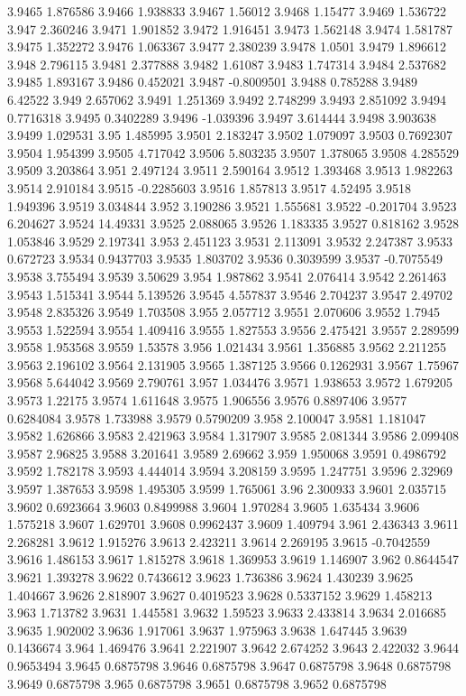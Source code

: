 3.9465  1.876586
3.9466  1.938833
3.9467  1.56012
3.9468  1.15477
3.9469  1.536722
3.947  2.360246
3.9471  1.901852
3.9472  1.916451
3.9473  1.562148
3.9474  1.581787
3.9475  1.352272
3.9476  1.063367
3.9477  2.380239
3.9478  1.0501
3.9479  1.896612
3.948  2.796115
3.9481  2.377888
3.9482  1.61087
3.9483  1.747314
3.9484  2.537682
3.9485  1.893167
3.9486  0.452021
3.9487  -0.8009501
3.9488  0.785288
3.9489  6.42522
3.949  2.657062
3.9491  1.251369
3.9492  2.748299
3.9493  2.851092
3.9494  0.7716318
3.9495  0.3402289
3.9496  -1.039396
3.9497  3.614444
3.9498  3.903638
3.9499  1.029531
3.95  1.485995
3.9501  2.183247
3.9502  1.079097
3.9503  0.7692307
3.9504  1.954399
3.9505  4.717042
3.9506  5.803235
3.9507  1.378065
3.9508  4.285529
3.9509  3.203864
3.951  2.497124
3.9511  2.590164
3.9512  1.393468
3.9513  1.982263
3.9514  2.910184
3.9515  -0.2285603
3.9516  1.857813
3.9517  4.52495
3.9518  1.949396
3.9519  3.034844
3.952  3.190286
3.9521  1.555681
3.9522  -0.201704
3.9523  6.204627
3.9524  14.49331
3.9525  2.088065
3.9526  1.183335
3.9527  0.818162
3.9528  1.053846
3.9529  2.197341
3.953  2.451123
3.9531  2.113091
3.9532  2.247387
3.9533  0.672723
3.9534  0.9437703
3.9535  1.803702
3.9536  0.3039599
3.9537  -0.7075549
3.9538  3.755494
3.9539  3.50629
3.954  1.987862
3.9541  2.076414
3.9542  2.261463
3.9543  1.515341
3.9544  5.139526
3.9545  4.557837
3.9546  2.704237
3.9547  2.49702
3.9548  2.835326
3.9549  1.703508
3.955  2.057712
3.9551  2.070606
3.9552  1.7945
3.9553  1.522594
3.9554  1.409416
3.9555  1.827553
3.9556  2.475421
3.9557  2.289599
3.9558  1.953568
3.9559  1.53578
3.956  1.021434
3.9561  1.356885
3.9562  2.211255
3.9563  2.196102
3.9564  2.131905
3.9565  1.387125
3.9566  0.1262931
3.9567  1.75967
3.9568  5.644042
3.9569  2.790761
3.957  1.034476
3.9571  1.938653
3.9572  1.679205
3.9573  1.22175
3.9574  1.611648
3.9575  1.906556
3.9576  0.8897406
3.9577  0.6284084
3.9578  1.733988
3.9579  0.5790209
3.958  2.100047
3.9581  1.181047
3.9582  1.626866
3.9583  2.421963
3.9584  1.317907
3.9585  2.081344
3.9586  2.099408
3.9587  2.96825
3.9588  3.201641
3.9589  2.69662
3.959  1.950068
3.9591  0.4986792
3.9592  1.782178
3.9593  4.444014
3.9594  3.208159
3.9595  1.247751
3.9596  2.32969
3.9597  1.387653
3.9598  1.495305
3.9599  1.765061
3.96  2.300933
3.9601  2.035715
3.9602  0.6923664
3.9603  0.8499988
3.9604  1.970284
3.9605  1.635434
3.9606  1.575218
3.9607  1.629701
3.9608  0.9962437
3.9609  1.409794
3.961  2.436343
3.9611  2.268281
3.9612  1.915276
3.9613  2.423211
3.9614  2.269195
3.9615  -0.7042559
3.9616  1.486153
3.9617  1.815278
3.9618  1.369953
3.9619  1.146907
3.962  0.8644547
3.9621  1.393278
3.9622  0.7436612
3.9623  1.736386
3.9624  1.430239
3.9625  1.404667
3.9626  2.818907
3.9627  0.4019523
3.9628  0.5337152
3.9629  1.458213
3.963  1.713782
3.9631  1.445581
3.9632  1.59523
3.9633  2.433814
3.9634  2.016685
3.9635  1.902002
3.9636  1.917061
3.9637  1.975963
3.9638  1.647445
3.9639  0.1436674
3.964  1.469476
3.9641  2.221907
3.9642  2.674252
3.9643  2.422032
3.9644  0.9653494
3.9645  0.6875798
3.9646  0.6875798
3.9647  0.6875798
3.9648  0.6875798
3.9649  0.6875798
3.965  0.6875798
3.9651  0.6875798
3.9652  0.6875798

